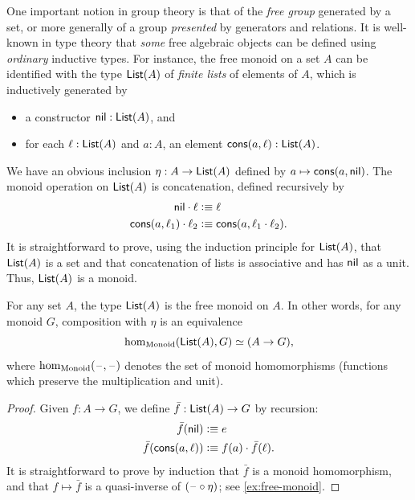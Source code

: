 %
%
One important notion in group theory is that of the \emph{free group} generated by a set, or more generally of a group \emph{presented} by generators and relations.
It is well-known in type theory that \emph{some} free algebraic objects can be defined using \emph{ordinary} inductive types.
%
%
%
%
For instance, the free monoid on a set $A$ can be identified with the type $\mathsf{List}(A)$ of \emph{finite lists}  of elements of $A$, which is inductively generated by
\begin{itemize}
\item a constructor $\mathsf{nil}:\mathsf{List}(A)$, and
\item for each $\ell:\mathsf{List}(A)$ and $a:A$, an element $\mathsf{cons}(a,\ell):\mathsf{List}(A)$.
\end{itemize}
We have an obvious inclusion $\eta : A\to \mathsf{List}(A)$ defined by $a\mapsto \mathsf{cons}(a,\mathsf{nil})$.
The monoid operation on $\mathsf{List}(A)$ is concatenation, defined recursively by
\begin{align*}
  \mathsf{nil} \cdot \ell &\vcentcolon\equiv \ell\\
  \mathsf{cons} (a,\ell_1) \cdot \ell_2 &\vcentcolon\equiv \mathsf{cons}(a, \ell_1\cdot\ell_2).
\end{align*}
It is straightforward to prove, using the induction principle for $\mathsf{List}(A)$, that $\mathsf{List}(A)$ is a set and that concatenation of lists is associative
%
and has $\mathsf{nil}$ as a unit.
Thus, $\mathsf{List}(A)$ is a monoid.

\begin{lem}\label{thm:free-monoid}
  For any set $A$, the type $\mathsf{List}(A)$ is the free monoid on $A$.
  In other words, for any monoid $G$, composition with $\eta$ is an equivalence
  \[ \hom_{\mathrm{Monoid}}(\mathsf{List}(A),G) \simeq (A\to G), \]
  where $\hom_{\mathrm{Monoid}}(\mathord{\hspace{1pt}\text{--}\hspace{1pt}},\mathord{\hspace{1pt}\text{--}\hspace{1pt}})$ denotes the set of monoid homomorphisms (functions which preserve the multiplication and unit).
\end{lem}
\begin{proof}
  Given $f:A\to G$, we define $\bar{f}:\mathsf{List}(A) \to G$ by recursion:
  \begin{align*}
    \bar{f}(\mathsf{nil}) &\vcentcolon\equiv e\\
    \bar{f}(\mathsf{cons}(a,\ell)) &\vcentcolon\equiv f(a) \cdot \bar{f}(\ell).
  \end{align*}
  It is straightforward to prove by induction that $\bar{f}$ is a monoid homomorphism, and that $f\mapsto \bar f$ is a quasi-inverse of $(\mathord{\hspace{1pt}\text{--}\hspace{1pt}}\circ \eta)$; see \cref{ex:free-monoid}.
\end{proof}

